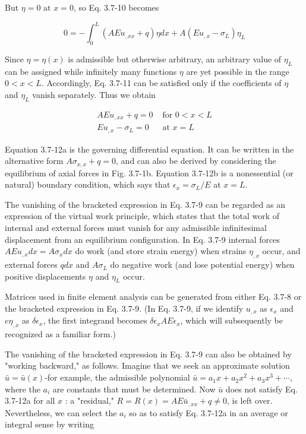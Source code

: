 \documentclass[10pt]{article}
\begin{document}
But $\eta=0$ at $x=0$, so Eq. 3.7-10 becomes

\begin{equation*}
0=-\int_{0}^{L}\left(A E u_{, x x}+q\right) \eta d x+A\left(E u_{, x}-\sigma_{L}\right) \eta_{L} \tag{3.7-11}
\end{equation*}

Since $\eta=\eta(x)$ is admissible but otherwise arbitrary, an arbitrary value of $\eta_{L}$ can be assigned while infinitely many functions $\eta$ are yet possible in the range $0 < x < L$. Accordingly, Eq. 3.7-11 can be satisfied only if the coefficients of $\eta$ and $\eta_{L}$ vanish separately. Thus we obtain

\begin{align*}
A E u_{, x x}+q=0 & \text { for } 0<x<L  \tag{3.7-12a}\\
E u_{, x}-\sigma_{L}=0 & \text { at } x=L \tag{3.7-12b}
\end{align*}

Equation 3.7-12a is the governing differential equation. It can be written in the alternative form $A \sigma_{x, x}+q=0$, and can also be derived by considering the equilibrium of axial forces in Fig. 3.7-1b. Equation 3.7-12b is a nonessential (or natural) boundary condition, which says that $\epsilon_{x}=\sigma_{L} / E$ at $x=L$.

The vanishing of the bracketed expression in Eq. 3.7-9 can be regarded as an expression of the virtual work principle, which states that the total work of internal and external forces must vanish for any admissible infinitesimal displacement from an equilibrium configuration. In Eq. 3.7-9 internal forces $A E u_{, x} d x=A \sigma_{x} d x$ do work (and store strain energy) when strains $\eta_{, x}$ occur, and external forces $q d x$ and $A \sigma_{L}$ do negative work (and lose potential energy) when positive displacements $\eta$ and $\eta_{L}$ occur.

Matrices used in finite element analysis can be generated from either Eq. 3.7-8 or the bracketed expression in Eq. 3.7-9. (In Eq. 3.7-9, if we identify $u_{, x}$ as $\epsilon_{x}$ and $e \eta_{,x}$ as $\delta \epsilon_{x}$, the first integrand becomes $\delta \epsilon_{x} A E \epsilon_{x}$, which will subsequently be recognized as a familiar form.)

The vanishing of the bracketed expression in Eq. 3.7-9 can also be obtained by "working backward," as follows. Imagine that we seek an approximate solution $\bar{u}=\bar{u}(x)$-for example, the admissible polynomial $\bar{u}=a_{1} x+a_{2} x^{2}+a_{3} x^{3} + \cdots$, where the $a_{i}$ are constants that must be determined. Now $\bar{u}$ does not satisfy Eq. 3.7-12a for all $x$ : a "residual," $R=R(x)=A E \bar{u}_{, x x}+q \neq 0$, is left over. Nevertheless, we can select the $a_{i}$ so as to satisfy Eq. 3.7-12a in an average or integral sense by writing
\end{document}

